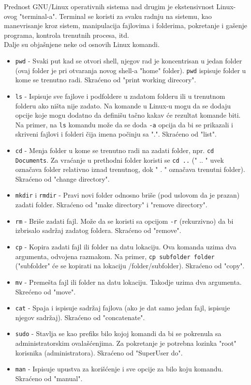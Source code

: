 Prednost GNU/Linux operativnih sistema nad drugim je ekstensivnost Linux-ovog "terminal-a". Terminal se koristi za svaku radnju na sistemu, kao manevrisanje kroz sistem, manipulacija fajlovima i folderima,  pokretanje i gašenje programa, kontrola trenutnih procesa, itd.\\
Dalje su objašnjene neke od osnovih Linux komandi.
\begin{itemize}
\item \texttt{pwd} - Svaki put kad se otvori shell, njegov rad je koncentrisan u jedan folder (ovaj folder je pri otvaranja novog shell-a "home" folder). \texttt{pwd} ispisuje folder u kome se trenutno radi. Skraćeno od "print working direcory". 

\item \texttt{ls} - Ispisuje sve fajlove i podfoldere u zadatom folderu ili u trenutnom folderu ako ništa nije zadato. Na komande u Linux-u mogu da se dodaju opcije koje mogu dodatno da definišu tačno kakav će rezultat komande biti. Na primer, na \texttt{ls} komandu može da se doda \texttt{-a} opcija da bi se prikazali i skriveni fajlovi i folderi čija imena počinju sa ".". Skraćeno od "list".

\item \texttt{cd} - Menja folder u kome se trenutno radi na zadati folder, npr. \texttt{cd Documents}. Za vraćanje u prethodni folder koristi se \texttt{cd ..} (" .. " uvek označava folder relativno iznad trenutnog, dok " . " označava trenutni folder). Skraćeno od "change directory".

\item \texttt{mkdir} i \texttt{rmdir} - Pravi novi folder odnosno briše (pod uslovom da je prazan) zadati folder. Skraćeno od "make directory" i "remove directory".

\item \texttt{rm} - Briše zadati fajl. Može da se koristi sa opcijom \texttt{-r} (rekurzivno) da bi izbrisalo sadržaj zadatog foldera. Skraćeno od "remove".

\item \texttt{cp} - Kopira zadati fajl ili folder na datu lokaciju. Ova komanda uzima dva argumenta, odvojena razmakom. Na primer, \texttt{cp subfolder folder} ("subfolder" će se kopirati na lokaciju /folder/subfolder). Skraćeno od "copy".

\item \texttt{mv} - Premešta fajl ili folder na datu lokaciju. Takodje uzima dva argumenta. Skrećeno od "move".

\item \texttt{cat} 	- Spaja i ispisuje sadržaj fajlova (ako je dat samo jedan fajl, ispisuje njegov sadržaj). Skraćeno od "concatenate".

\item \texttt{sudo} - Stavlja se kao prefiks bilo kojoj komandi da bi se pokrenula sa administratorskim ovalašćenjima. Za pokretanje je potrebna lozinka "root" korisnika (administratora). Skraćeno od "SuperUser do".

\item \texttt{man} - Ispisuje upustva za korišćenje i sve opcije za bilo koju komandu. Skraćeno od "manual".
\end{itemize}
